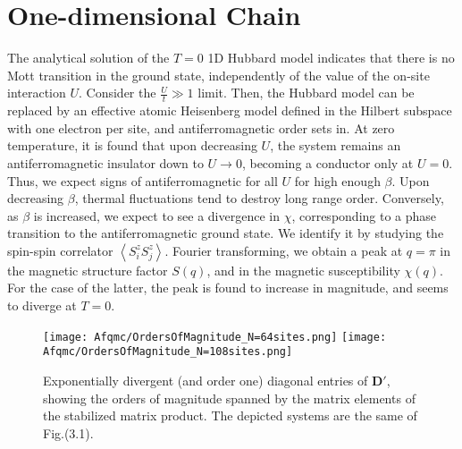 \section{One-dimensional Chain}
\label{sec:1d-chain}

The analytical solution of the $T= 0$ \acs{1D} Hubbard model indicates that there is no Mott transition \cite{lieb_absence_1968} in the ground state, independently of the value of the on-site interaction $U$.
Consider the $\frac{U}{t} \gg 1$ limit. 
Then, the Hubbard model can be replaced by an effective atomic Heisenberg model defined in the Hilbert subspace with one electron per site, and antiferromagnetic order sets in.
At zero temperature, it is found that upon decreasing $U$, the system remains an antiferromagnetic insulator down to $U \rightarrow 0$, becoming a conductor only at $U = 0$.
Thus, we expect signs of antiferromagnetic for all $U$ for high enough $\beta$.
Upon decreasing $\beta$, thermal fluctuations tend to destroy long range order.
Conversely, as $\beta$ is increased, we expect to see a divergence in $\chi$, corresponding to a phase transition to the antiferromagnetic ground state.
We identify it by studying the spin-spin correlator $\left\langle S^z_i S^z_j \right\rangle$.
Fourier transforming, we obtain a peak at $q = \pi$ in the magnetic structure factor $S ( q ) $, and in the magnetic susceptibility $\chi (q)$.
For the case of the latter, the peak is found to increase in magnitude, and seems to diverge at $T = 0$.

\begin{figure}[H]\label{fig:divergences}
\hspace{0.3cm}
\texttt{[image: Afqmc/OrdersOfMagnitude\_N=64sites.png]}
\hspace{0.3cm}
\texttt{[image: Afqmc/OrdersOfMagnitude\_N=108sites.png]}
\caption[Exponentially divergent diagonal entries of $\bm D'$, showing the orders of magnitude spanned by the matrix elements of the stabilized matrix product.]{Exponentially divergent (and order one)  diagonal entries of $\bm D'$, showing the orders of magnitude spanned by the matrix elements of the stabilized matrix product.
The depicted systems are the same of Fig.(3.1). }
\end{figure}